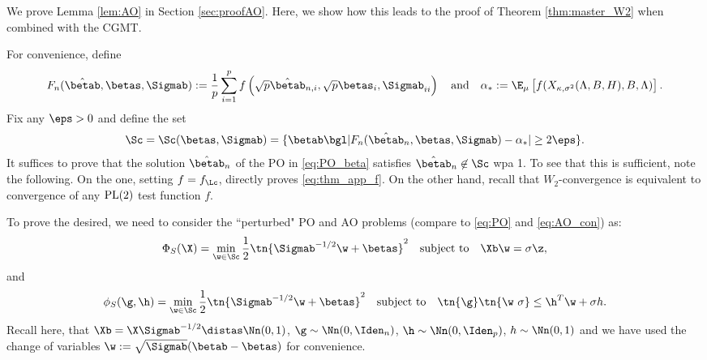 

We prove Lemma \ref{lem:AO} in Section \ref{sec:proofAO}. Here, we show how this leads to the proof of Theorem \ref{thm:master_W2} when combined with the CGMT.

 For convenience, 
 define 
$$F_n(\hat\betab,\betas,\Sigmab):=\frac{1}{p} \sum_{i=1}^{p} f\left(\sqrt{p}\hat\betab_{n,i},\sqrt{p}\betas_{i},\Sigmab_{ii}\right)\quad\text{and}\quad\alpha_*:=\E_\mu\left[f(X_{\kappa,\sigma^2}(\Lambda,B,H),B,\Lambda)\right].$$
Fix  any $\eps>0$ and define the set 
\begin{align}\label{eq:S_set}
\Sc = \Sc(\betas,\Sigmab) =\{\betab\bgl |F_n(\hat\betab_n,\betas,\Sigmab)-\alpha_*|\geq 2\eps\}.
\end{align}
It suffices to prove that the solution $\hat\betab_n$ of the PO in \eqref{eq:PO_beta} satisfies $\hat\betab_n\not\in\Sc$ wpa 1. To see that this is sufficient, note the following. On the one, setting $f=f_\Lc$, directly proves \eqref{eq:thm_app_f}. On the other hand, recall that $W_2$-convergence is equivalent to convergence of any $\rm{PL}(2)$ test function $f$. 

To prove the desired, we need to consider the ``perturbed" PO and AO problems (compare to \eqref{eq:PO} and \eqref{eq:AO_con}) as:
\begin{align}\label{eq:PO_S}
\Phi_S(\X)=\min_{\w\in\Sc} \frac{1}{2}\tn{\Sigmab^{-1/2}\w+\betas}^2\quad\text{subject to}\quad \Xb\w=\sigma \z,
\end{align}
and
\begin{align}
\phi_S(\g,\h)=\min_{\w\in\Sc} \frac{1}{2}\tn{\Sigmab^{-1/2}\w+\betas}^2\quad\text{subject to}\quad \tn{\g}\tn{\w~{\sigma}}\leq \h^T\w+\sigma h.\label{eq:AO_S}
\end{align}%
Recall here, that $\Xb=\X\Sigmab^{-1/2}\distas\Nn(0,1)$, $\g\sim\Nn(0,\Iden_n)$, $\h\sim\Nn(0,\Iden_p)$, $h\sim \Nn(0,1)$ and we have used the change of variables $\w:=\sqrt{\Sigmab}(\betab-\betas)$ for convenience. 

